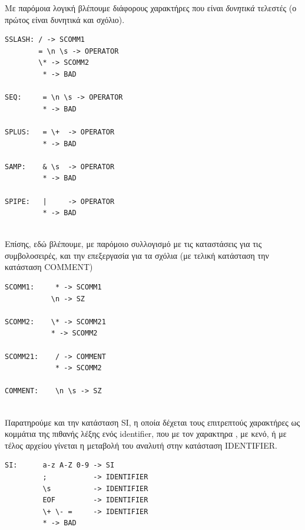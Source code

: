 \documentclass[14pt]{extarticle}
\begin{document}
\clearpage
Με παρόμοια λογική βλέπουμε διάφορους χαρακτήρες που είναι \emph{δυνητικά} τελεστές (ο πρώτος είναι δυνητικά και σχόλιο).
    \begin{lstlisting}
SSLASH: / -> SCOMM1
        = \n \s -> OPERATOR
        \* -> SCOMM2
         * -> BAD
    
SEQ:     = \n \s -> OPERATOR
         * -> BAD

SPLUS:   = \+  -> OPERATOR
         * -> BAD

SAMP:    & \s  -> OPERATOR
         * -> BAD

SPIPE:   |     -> OPERATOR
         * -> BAD
    \end{lstlisting}
\\   
Επίσης, εδώ βλέπουμε, με παρόμοιο συλλογισμό με τις καταστάσεις για τις συμβολοσειρές, και την επεξεργασία για τα σχόλια (με τελική κατάσταση την κατάσταση \textlatin{COMMENT})
    \begin{lstlisting}
SCOMM1:     * -> SCOMM1
           \n -> SZ

SCOMM2:    \* -> SCOMM21
           * -> SCOMM2
            
SCOMM21:    / -> COMMENT
            * -> SCOMM2

COMMENT:    \n \s -> SZ  
    \end{lstlisting}
\\
Παρατηρούμε και την κατάσταση \textlatin{SI}, η οποία δέχεται τους επιτρεπτούς χαρακτήρες ως κομμάτια της πιθανής λέξης ενός \textlatin{identifier}, που με τον χαρακτηρα \boxed{;}, με κενό, ή με τέλος αρχείου γίνεται η μεταβολή του αναλυτή στην κατάσταση \textlatin{IDENTIFIER}.
    \begin{lstlisting}
SI:      a-z A-Z 0-9 -> SI
         ;           -> IDENTIFIER
         \s          -> IDENTIFIER 
         EOF         -> IDENTIFIER
         \+ \- =     -> IDENTIFIER
         * -> BAD
    \end{lstlisting}
\end{document}
